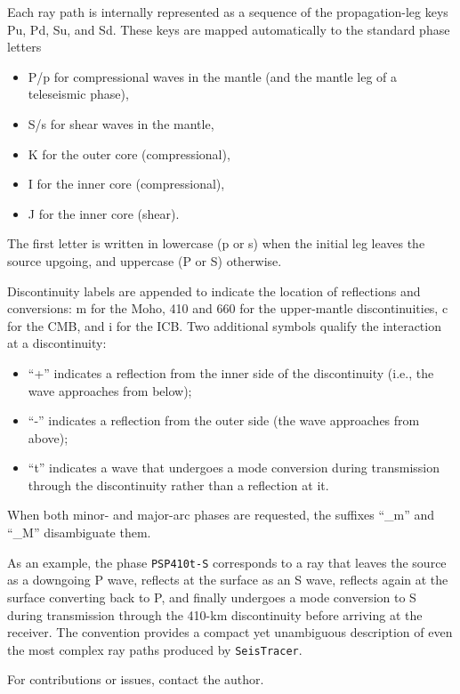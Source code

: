 \documentclass[12pt,a4paper]{article}
\begin{document}
Each ray path is internally represented as a sequence of the propagation-leg keys Pu, Pd, Su, and Sd. These keys are mapped automatically to the standard phase letters
\begin{itemize}
  \item P/p for compressional waves in the mantle (and the mantle leg of a teleseismic phase),
  \item S/s for shear waves in the mantle,
  \item K for the outer core (compressional),
  \item I for the inner core (compressional),
  \item J for the inner core (shear).
\end{itemize}
The first letter is written in lowercase (p or s) when the initial leg leaves the source upgoing, and uppercase (P or S) otherwise.

Discontinuity labels are appended to indicate the location of reflections and conversions: m for the Moho, 410 and 660 for the upper-mantle discontinuities, c for the CMB, and i for the ICB. Two additional symbols qualify the interaction at a discontinuity:
\begin{itemize}
  \item ``+'' indicates a reflection from the inner side of the discontinuity (i.e., the wave approaches from below);
  \item ``-'' indicates a reflection from the outer side (the wave approaches from above);
  \item ``t'' indicates a wave that undergoes a mode conversion during transmission through the discontinuity rather than a reflection at it.
\end{itemize}

When both minor- and major-arc phases are requested, the suffixes ``\_m'' and ``\_M'' disambiguate them.

As an example, the phase \texttt{PSP410t-S} corresponds to a ray that leaves the source as a downgoing P wave, reflects at the surface as an S wave, reflects again at the surface converting back to P, and finally undergoes a mode conversion to S during transmission through the 410-km discontinuity before arriving at the receiver. The convention provides a compact yet unambiguous description of even the most complex ray paths produced by \texttt{SeisTracer}.

For contributions or issues, contact the author.
\end{document}
